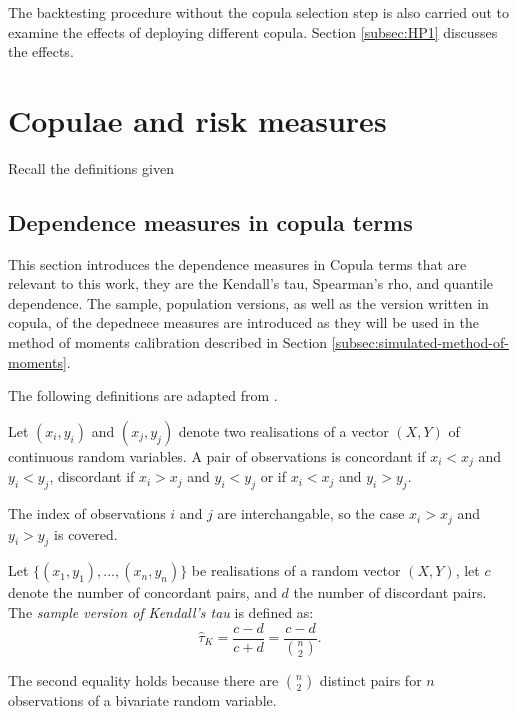 The backtesting procedure without the copula selection step is also carried out to examine the effects of deploying different copula. 
Section \ref{subsec:HP1} discusses the effects. 

\section{Copulae and risk measures}\label{sec:crm}

Recall the definitions given 

\subsection{Dependence measures in copula terms}
This section introduces the dependence measures in Copula terms that are relevant to this work, 
they are the Kendall's tau, Spearman's rho, and quantile dependence. 
The sample, population versions, as well as the version written in copula, 
of the depednece measures are introduced as they will be used in the method of moments calibration described in Section \ref{subsec:simulated-method-of-moments}. 

The following definitions are adapted from \cite{Nelsen1999}. 

\begin{defi}[Concordance]
  Let $(x_i, y_i)$ and $(x_j, y_j)$ denote two realisations of a
  vector $(X, Y)$ of continuous random variables. 
  A pair of observations is concordant if $x_i<x_j$ and $y_i < y_j$, discordant if
  $x_i>x_j$ and $y_i < y_j$ or if $x_i<x_j$ and $y_i>y_j$. 
\end{defi}

The index of observations $i$ and $j$ are interchangable, so the case
$x_i>x_j$ and $y_i>y_j$ is covered.

\begin{defi}
  Let $\{(x_1, y_1), ..., (x_n, y_n)\}$ be realisations of a random vector $(X, Y)$,
  let $c$ denote the number of concordant pairs, and $d$ the number of discordant pairs. 
  The {\em{sample version of Kendall's tau}} is defined as:
  \begin{equation*}
  \hat \tau_K = \frac{c-d}{c+d} = \frac{c-d}{\binom{n}{2}}. 
  \end{equation*}
  \end{defi} %

  The second equality holds because there are $\binom{n}{2}$ distinct pairs for $n$ observations of a bivariate random variable. 

